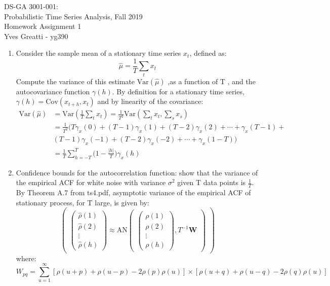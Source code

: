 \documentclass{article}
\newcommand{\0}{\mat{0}}
\newcommand{\matr}[1]{\bm{#1}}     %
\newcommand{\Var}{\mathrm{Var}}
\newcommand{\Cov}{\mathrm{Cov}}
\begin{document}
\noindent DS-GA 3001-001:\\
Probabilistic Time Series Analysis, Fall 2019\\
Homework Assignment 1 \\
Yves Greatti - yg390\\

\begin{enumerate}
	\item Consider the sample mean of a stationary time series $x_t$, defined as:
	\[
		\hat{\mu} = \frac{1}{T}\sum_t x_t
	\]
	Compute the variance of this estimate $\Var{(\hat{\mu})}$ ,as a function of T , and the autocovariance function $\gamma(h)$.
	By definition for a stationary time series, $\gamma(h)=\Cov{(x_{t+h}, x_t)}$ and by linearity of the covariance:
	\begin{align*}
		\Var{(\hat{\mu})}	&= \Var{(\frac{1}{T}\sum_t x_t)} = \frac{1} {T^2} \Var{(\sum_t x_t, \sum_s x_s)} \\
						&= \frac{1} {T^2} \big(T \gamma_x(0) + (T-1) \gamma_x(1) + (T-2) \gamma_x(2) + \cdots +  \gamma_x(T-1) + \\
						& (T-1)  \gamma_x(-1) +  (T-2) \gamma_x(-2) + \cdots +  \gamma_x(1-T) \big ) \\
						&= \frac{1} {T} \sum_{h=-T}^T \big ( 1 - \frac{|h|}{T} \big) \gamma_x(h)
	\end{align*}
	
	\item Confidence bounds for the autocorrelation function: show that the variance of the empirical ACF for white noise with variance $\sigma^2$ given T data points is $\frac{1}{T}$.
	By Theorem A.7 from ts4.pdf, asymptotic variance of the empirical ACF of stationary process, for T large, is given by:
	\[
	\begin{pmatrix}
		\begin{pmatrix}
    			\hat{\rho}(1) \\ \hat{\rho}(2)  \\ \vdots \\  \hat{\rho}(h)
		\end{pmatrix}
		\approx \text{AN}
		\begin{pmatrix}
			\begin{pmatrix}
    				\rho(1) \\ \rho(2)  \\ \vdots \\  \rho(h)
			\end{pmatrix}
			,
			T^{-1} \matr{W}
		\end{pmatrix}
	\end{pmatrix}
	\]
	where: $$W_{pq} = \sum_{u=1}^\infty [\rho(u+p) + \rho(u-p) -2 \rho(p) \rho(u)] \times [\rho(u+q) + \rho(u-q) -2 \rho(q) \rho(u)] $$
	

\end{enumerate}
\end{document}
